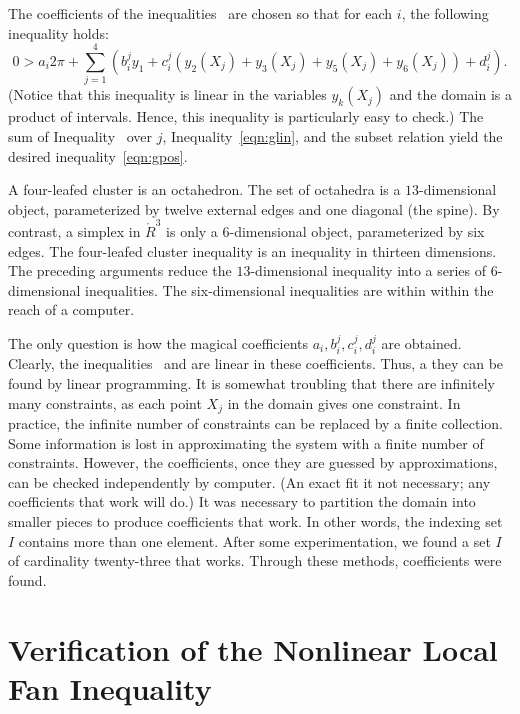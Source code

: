 The coefficients of the inequalities~
are chosen so that for each $i$, the following inequality holds:
\begin{equation}\label{eqn:glin} 
0 > a_i 2\pi + 
\sum_{j=1}^4 (b_i^j y_1 +  c_i^j (y_2(X_j)+y_3(X_j)+y_5(X_j)+y_6(X_j)) + d_i^j).
\end{equation}
(Notice that this inequality is linear in the variables $y_k(X_j)$ and
the domain is a product of intervals.  Hence, this inequality is
particularly easy to check.)  The sum of Inequality~ over $j$, Inequality~\ref{eqn:glin},
and the subset relation yield the desired inequality~\ref{eqn:gpos}.

A four-leafed cluster is an octahedron.  The set of octahedra is a
$13$-dimensional object, parameterized by twelve external edges and one
diagonal (the spine).  By contrast, a simplex in $\ring{R}^3$ is only
a $6$-dimensional object, parameterized by six edges.  The four-leafed
cluster inequality is an inequality in thirteen dimensions.  The preceding
arguments reduce the $13$-dimensional inequality into a series of
$6$-dimensional inequalities.  The six-dimensional inequalities are
within within the reach of a computer.

The only question is how the magical coefficients
$a_i,b_i^j,c_i^j,d_i^j$ are obtained.  Clearly, the
inequalities~ and  are linear in these
coefficients.  Thus, a they can be found by linear programming.  It is
somewhat troubling that there are infinitely many constraints, as each
point $X_j$ in the domain gives one constraint.  In practice, the
infinite number of constraints can be replaced by a finite collection.
Some information is lost in approximating the system with a finite
number of constraints.  However, the coefficients, once they are
guessed by approximations, can be checked independently by computer.
(An exact fit it not necessary; any coefficients that work will do.)
It was necessary to partition the domain into smaller pieces to
produce coefficients that work.  In other words, the indexing set $I$
contains more than one element.  After some experimentation, we found
a set $I$ of cardinality twenty-three that works.  Through these methods,
coefficients were found.



\chapter{Verification of the Nonlinear Local Fan Inequality}

